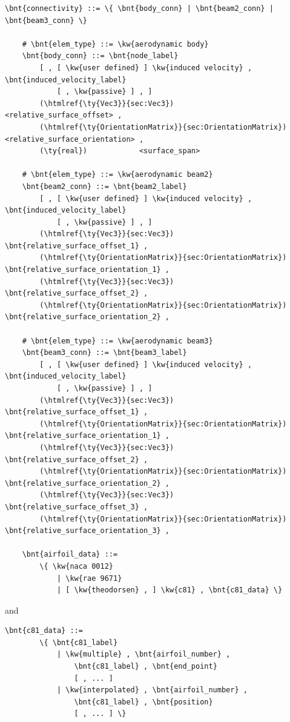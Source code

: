 \begin{Verbatim}[commandchars=\\\{\}]
    \bnt{connectivity} ::= \{ \bnt{body_conn} | \bnt{beam2_conn} | \bnt{beam3_conn} \}

    # \bnt{elem_type} ::= \kw{aerodynamic body}
    \bnt{body_conn} ::= \bnt{node_label}
        [ , [ \kw{user defined} ] \kw{induced velocity} , \bnt{induced_velocity_label}
            [ , \kw{passive} ] , ] 
        (\htmlref{\ty{Vec3}}{sec:Vec3})              <relative_surface_offset> , 
        (\htmlref{\ty{OrientationMatrix}}{sec:OrientationMatrix}) <relative_surface_orientation> ,
        (\ty{real})            <surface_span>

    # \bnt{elem_type} ::= \kw{aerodynamic beam2}
    \bnt{beam2_conn} ::= \bnt{beam2_label}
        [ , [ \kw{user defined} ] \kw{induced velocity} , \bnt{induced_velocity_label}
            [ , \kw{passive} ] , ] 
        (\htmlref{\ty{Vec3}}{sec:Vec3})              \bnt{relative_surface_offset_1} ,
        (\htmlref{\ty{OrientationMatrix}}{sec:OrientationMatrix}) \bnt{relative_surface_orientation_1} ,
        (\htmlref{\ty{Vec3}}{sec:Vec3})              \bnt{relative_surface_offset_2} ,
        (\htmlref{\ty{OrientationMatrix}}{sec:OrientationMatrix}) \bnt{relative_surface_orientation_2} ,

    # \bnt{elem_type} ::= \kw{aerodynamic beam3}
    \bnt{beam3_conn} ::= \bnt{beam3_label} 
        [ , [ \kw{user defined} ] \kw{induced velocity} , \bnt{induced_velocity_label}
            [ , \kw{passive} ] , ] 
        (\htmlref{\ty{Vec3}}{sec:Vec3})              \bnt{relative_surface_offset_1} ,
        (\htmlref{\ty{OrientationMatrix}}{sec:OrientationMatrix}) \bnt{relative_surface_orientation_1} ,
        (\htmlref{\ty{Vec3}}{sec:Vec3})              \bnt{relative_surface_offset_2} ,
        (\htmlref{\ty{OrientationMatrix}}{sec:OrientationMatrix}) \bnt{relative_surface_orientation_2} ,
        (\htmlref{\ty{Vec3}}{sec:Vec3})              \bnt{relative_surface_offset_3} ,       
        (\htmlref{\ty{OrientationMatrix}}{sec:OrientationMatrix}) \bnt{relative_surface_orientation_3} ,

    \bnt{airfoil_data} ::=
        \{ \kw{naca 0012}
            | \kw{rae 9671}
            | [ \kw{theodorsen} , ] \kw{c81} , \bnt{c81_data} \}
\end{Verbatim}
and
\begin{Verbatim}[commandchars=\\\{\}]
    \bnt{c81_data} ::=
        \{ \bnt{c81_label}
            | \kw{multiple} , \bnt{airfoil_number} ,
                \bnt{c81_label} , \bnt{end_point}
                [ , ... ]
            | \kw{interpolated} , \bnt{airfoil_number} ,
                \bnt{c81_label} , \bnt{position}
                [ , ... ] \}
\end{Verbatim}
